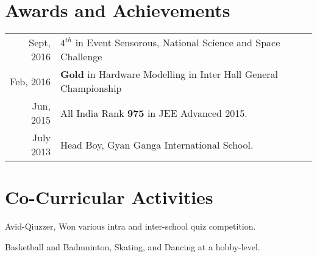 \documentclass[letterpaper]{deedy-resume} %
\begin{document}
\begin{minipage}[t]{0.66\textwidth}
\section{Awards and Achievements} 

\begin{tabular}{rl}
Sept, 2016 & $4^{th}$ in Event Sensorous, National Science and Space Challenge\\
Feb, 2016 & \textbf{Gold} in Hardware Modelling in Inter Hall General Championship\\
Jun, 2015 & All India Rank \textbf{975} in JEE Advanced 2015.\\
July 2013 & Head Boy, Gyan Ganga International School.\\
\end{tabular}

\sectionspace %


\section{Co-Curricular Activities} 
\sectionspace
\sectionspace
\begin{tightitemize} 
\item Avid-Qiuzzer, Won various intra and inter-school quiz competition.
\item Basketball and Badmninton, Skating, and Dancing at a hobby-level.
\end{tightitemize}




\end{minipage}
\end{document}
